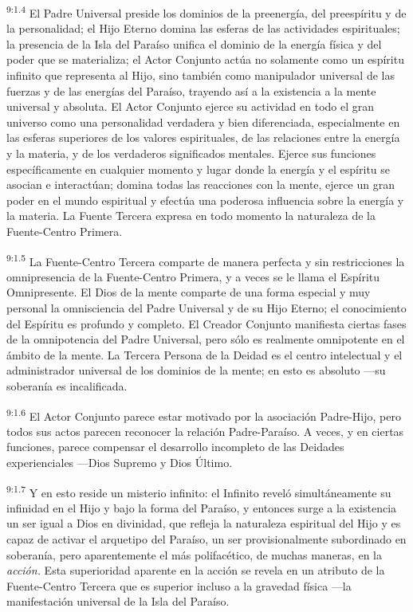 \par
\textsuperscript{9:1.4} El Padre Universal preside los dominios de la preenergía, del preespíritu y de la personalidad; el Hijo Eterno domina las esferas de las actividades espirituales; la presencia de la Isla del Paraíso unifica el dominio de la energía física y del poder que se materializa; el Actor Conjunto actúa no solamente como un espíritu infinito que representa al Hijo, sino también como manipulador universal de las fuerzas y de las energías del Paraíso, trayendo así a la existencia a la mente universal y absoluta. El Actor Conjunto ejerce su actividad en todo el gran universo como una personalidad verdadera y bien diferenciada, especialmente en las esferas superiores de los valores espirituales, de las relaciones entre la energía y la materia, y de los verdaderos significados mentales. Ejerce sus funciones específicamente en cualquier momento y lugar donde la energía y el espíritu se asocian e interactúan; domina todas las reacciones con la mente, ejerce un gran poder en el mundo espiritual y efectúa una poderosa influencia sobre la energía y la materia. La Fuente Tercera expresa en todo momento la naturaleza de la Fuente-Centro Primera.

\par
\textsuperscript{9:1.5} La Fuente-Centro Tercera comparte de manera perfecta y sin restricciones la omnipresencia de la Fuente-Centro Primera, y a veces se le llama el Espíritu Omnipresente. El Dios de la mente comparte de una forma especial y muy personal la omnisciencia del Padre Universal y de su Hijo Eterno; el conocimiento del Espíritu es profundo y completo. El Creador Conjunto manifiesta ciertas fases de la omnipotencia del Padre Universal, pero sólo es realmente omnipotente en el ámbito de la mente. La Tercera Persona de la Deidad es el centro intelectual y el administrador universal de los dominios de la mente; en esto es absoluto ---su soberanía es incalificada.

\par
\textsuperscript{9:1.6} El Actor Conjunto parece estar motivado por la asociación Padre-Hijo, pero todos sus actos parecen reconocer la relación Padre-Paraíso. A veces, y en ciertas funciones, parece compensar el desarrollo incompleto de las Deidades experienciales ---Dios Supremo y Dios Último.

\par
\textsuperscript{9:1.7} Y en esto reside un misterio infinito: el Infinito reveló simultáneamente su infinidad en el Hijo y bajo la forma del Paraíso, y entonces surge a la existencia un ser igual a Dios en divinidad, que refleja la naturaleza espiritual del Hijo y es capaz de activar el arquetipo del Paraíso, un ser provisionalmente subordinado en soberanía, pero aparentemente el más polifacético, de muchas maneras, en la \textit{acción.} Esta superioridad aparente en la acción se revela en un atributo de la Fuente-Centro Tercera que es superior incluso a la gravedad física ---la manifestación universal de la Isla del Paraíso.

